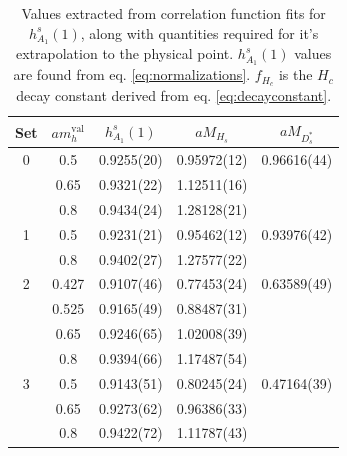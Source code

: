 \begin{table}
  \begin{center}
    \begin{tabular}{ c c c c c }
      \hline
      Set & $am_h^{\text{val}}$ & $h^s_{A_1}(1)$& $aM_{H_s}$& $aM_{D^*_s}$ \\ [0.5ex]
      \hline
      0 & 0.5 & 0.9255(20) & 0.95972(12) & 0.96616(44)\\ [0.5ex]
      & 0.65 & 0.9321(22) & 1.12511(16) & \\ [0.5ex]
      & 0.8 & 0.9434(24) & 1.28128(21) & \\ [0.5ex]
      \hline
      1 & 0.5 & 0.9231(21) & 0.95462(12) & 0.93976(42)\\ [0.5ex]
      & 0.8 & 0.9402(27) & 1.27577(22) & \\ [0.5ex]
      \hline
      2 & 0.427 & 0.9107(46) & 0.77453(24) & 0.63589(49)\\ [0.5ex]
      & 0.525 & 0.9165(49) & 0.88487(31) & \\ [0.5ex]
      & 0.65 & 0.9246(65) & 1.02008(39) & \\ [0.5ex]
      & 0.8 & 0.9394(66) & 1.17487(54) & \\ [0.5ex]
      \hline
      3 & 0.5 & 0.9143(51) & 0.80245(24) & 0.47164(39)\\ [0.5ex]
      & 0.65 & 0.9273(62) & 0.96386(33) & \\ [0.5ex]
      & 0.8 & 0.9422(72) & 1.11787(43) & \\ [0.5ex]
      \hline
    \end{tabular}
    \caption{Values extracted from correlation function fits for $h^s_{A_1}(1)$, along with quantities required for it's extrapolation to the physical point. $h^s_{A_1}(1)$ values are found from eq. \eqref{eq:normalizations}. $f_{H_c}$  is the $H_c$ decay constant derived from eq. \eqref{eq:decayconstant}.  \label{tab:results} }
  \end{center}
\end{table}

